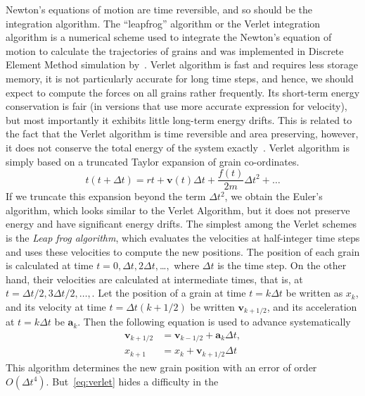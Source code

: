 Newton's equations of motion are time reversible, and so should be the 
integration algorithm. The ``leapfrog'' algorithm or the Verlet integration 
algorithm is a numerical scheme used to integrate the Newton's equation of 
motion to calculate the trajectories of grains and was implemented in 
Discrete Element Method simulation by~\citet{Verlet1967}. Verlet algorithm is 
fast and requires less storage memory, it is not particularly accurate for long 
time steps, and hence, we should expect to compute the forces on all grains 
rather frequently. Its short-term energy conservation is fair (in versions that 
use more accurate expression for velocity), but most importantly it exhibits 
little long-term energy drifts. This is related to the fact that the Verlet 
algorithm is time reversible and area preserving, however, it does not conserve 
the total energy of the system exactly~\citep{Frenkel1996}. Verlet algorithm is 
simply based on a truncated Taylor expansion of grain co-ordinates. 
%
\begin{equation}
t(t+\Delta t)=r{t} +\mathbf{v}(t) \Delta t + \frac{f(t)}{2\mathit{m}} \Delta 
t^{2}+ \dots
\end{equation}
%
If we truncate this expansion beyond the term $\Delta t^{2}$, we obtain the 
Euler's algorithm, which looks similar to the Verlet Algorithm, but it does not 
preserve energy and have significant energy drifts. The simplest among the 
Verlet schemes is the \textit{Leap frog algorithm}, which evaluates the 
velocities at half-integer time steps and uses these velocities to compute the 
new positions. The position of each grain is calculated at time $t=0, \Delta t, 
2\Delta t, $\dots$ ,$ where $\Delta t$ is the time step. On the other hand, 
their velocities are calculated at intermediate times, that is, at $t=\Delta 
t/2, 3 \Delta t/2, \dots,$. Let the position of a grain at time $t=k\Delta t$ 
be written as $x_{\mathit{k}}$, and its velocity at time $t=\Delta t (k + 
1/2)$ be written $\mathbf{v}_{\mathit{k + 1/2}}$, and its acceleration at $t=k 
\Delta t$ be $\mathbf{a}_{\mathit{k}}$. Then the following equation is used to 
advance systematically
%
\begin{align}\label{eq:verlet}
\mathbf{v}_{\mathit{k}+1/2} & 
=\mathbf{v}_{\mathit{k}-1/2}+\mathbf{a}_{\mathit{k}}
 \Delta t, \\
x_{\mathit{k}+1} & =x_{\mathit{k}}+\mathbf{v}_{\mathit{k}+1/2} \Delta t
\end{align}
%
This algorithm determines the new grain position with an error of order 
$\mathit{O}( \Delta t^{4})$. But~\cref{eq:verlet} hides a difficulty in the 
